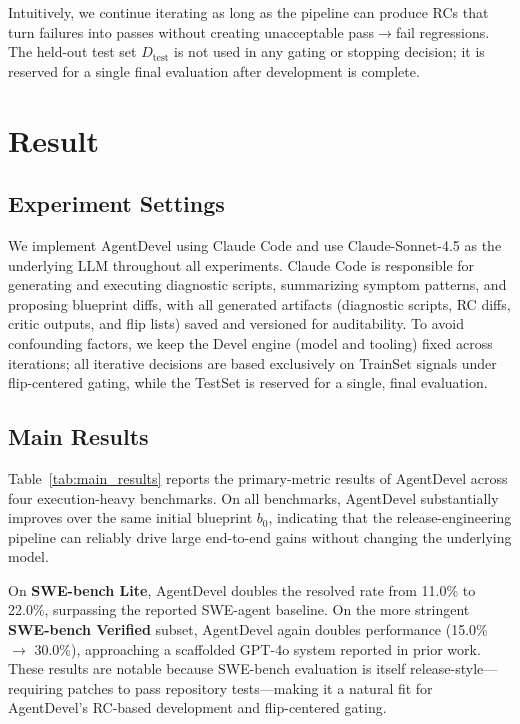 \documentclass[11pt]{article}
\begin{document}
Intuitively, we continue iterating as long as the pipeline can produce RCs that turn failures into passes without creating unacceptable pass$\rightarrow$fail regressions. The held-out test set $D_{\text{test}}$ is not used in any gating or stopping decision; it is reserved for a single final evaluation after development is complete.

\section{Result}
\subsection{Experiment Settings}

We implement AgentDevel using Claude Code and use Claude-Sonnet-4.5 as the underlying LLM throughout all experiments. Claude Code is responsible for generating and executing diagnostic scripts, summarizing symptom patterns, and proposing blueprint diffs, with all generated artifacts (diagnostic scripts, RC diffs, critic outputs, and flip lists) saved and versioned for auditability. To avoid confounding factors, we keep the Devel engine (model and tooling) fixed across iterations; all iterative decisions are based exclusively on TrainSet signals under flip-centered gating, while the TestSet is reserved for a single, final evaluation.

\subsection{Main Results}



Table~\ref{tab:main_results} reports the primary-metric results of AgentDevel across four execution-heavy benchmarks. On all benchmarks, AgentDevel substantially improves over the same initial blueprint \(b_0\), indicating that the release-engineering pipeline can reliably drive large end-to-end gains without changing the underlying model.

On \textbf{SWE-bench Lite}, AgentDevel doubles the resolved rate from 11.0\% to 22.0\%, surpassing the reported SWE-agent baseline. On the more stringent \textbf{SWE-bench Verified} subset, AgentDevel again doubles performance (15.0\% $\rightarrow$ 30.0\%), approaching a scaffolded GPT-4o system reported in prior work. These results are notable because SWE-bench evaluation is itself release-style—requiring patches to pass repository tests—making it a natural fit for AgentDevel’s RC-based development and flip-centered gating.
\end{document}
